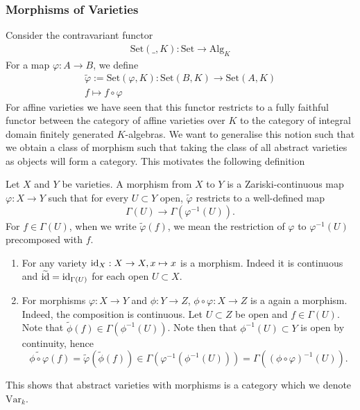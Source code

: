     \subsubsection{Morphisms of Varieties}
    Consider the contravariant functor
    \begin{gather*}
        \mathrm{Set}(\_,K): \mathrm{Set} \rightarrow \mathrm{Alg}_K
    \end{gather*}
    For a map $\varphi:A\rightarrow B$, we define 
    \begin{gather*}
        \widetilde{\varphi} := \mathrm{Set}(\varphi,K) : \mathrm{Set}(B,K)\rightarrow \mathrm{Set}(A,K)\\
        f \mapsto f\circ \varphi    
    \end{gather*}
    For affine varieties we have seen that this functor restricts to a fully faithful functor between the category of affine varieties over $K$ to the category of integral domain finitely generated $K$-algebras.
    We want to generalise this notion such that we obtain a class of morphism such that taking the class of all abstract varieties as objects will form a category. This motivates the following definition 
    \begin{definition}
        Let $X$ and $Y$ be varieties. A morphism from $X$ to $Y$ is a Zariski-continuous map $\varphi: X\rightarrow Y$ such that for every $U\subset Y$ open, $\widetilde{\varphi}$ restricts to a well-defined map 
        $$
            \Gamma(U)\rightarrow \Gamma(\varphi^{-1}(U)).
        $$ 
        For $f\in \Gamma(U)$, when we write $\widetilde{\varphi}(f)$, we mean the restriction of $\varphi$ to $\varphi^{-1}(U)$ precomposed with $f$. 
    \end{definition}
    \begin{remark}
        \begin{enumerate}
            \item For any variety $\mathrm{id}_X: X\rightarrow X, x\mapsto x$ is a morphism. Indeed it is continuous and $\widetilde{\mathrm{id}} = \mathrm{id}_{\Gamma(U)}$ for each open $U\subset X$. 
            \item For morphisms $\varphi : X\rightarrow Y$ and $\phi: Y \rightarrow Z$, $\phi \circ\varphi : X\rightarrow Z$ is a again a morphism. Indeed, the composition is continuous. Let $U\subset Z$ be open and $f\in \Gamma(U)$. Note that $\widetilde{\phi}(f)\in \Gamma\left(\phi^{-1}(U)\right)$. Note then that $\phi^{-1}(U)\subset Y$ is open by continuity, hence 
            $$
                \widetilde{\phi\circ \varphi}(f)= \widetilde{\varphi}(\widetilde{\phi}(f))\in \Gamma\left(\varphi^{-1}\left(\phi^{-1}\left(U\right)\right)\right)= \Gamma\left(\left(\phi\circ \varphi\right)^{-1}(U)\right).
            $$ 
        \end{enumerate}
        This shows that abstract varieties with morphisms is a category which we denote $\mathrm{Var}_k$.
    \end{remark}
